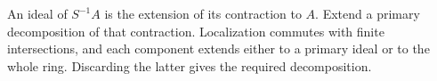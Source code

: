 An ideal of $S^{-1}A$ is the extension of its contraction to $A$. Extend a primary decomposition of that contraction. Localization commutes with finite intersections, and each component extends either to a primary ideal or to the whole ring. Discarding the latter gives the required decomposition.
